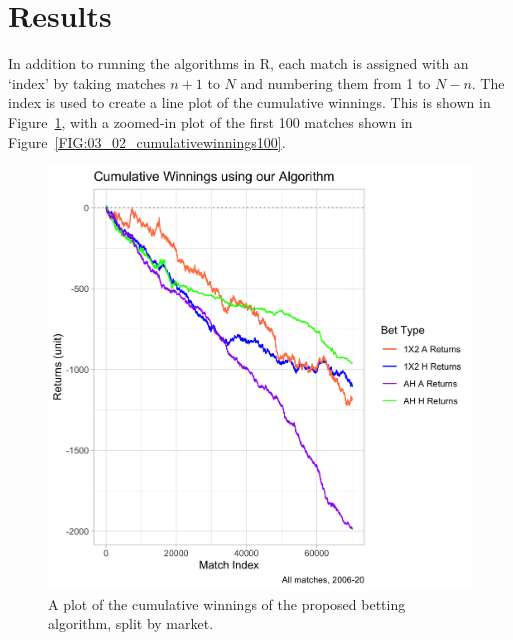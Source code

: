 \documentclass[a4paper,10pt]{report}
\begin{document}
\pagebreak
\section{Results}\label{sec:modelresults}

In addition to running the algorithms in R, each match is assigned with an `index' by taking matches $n+1$ to $N$ and numbering them from 1 to $N-n$. The index is used to create a line plot of the cumulative winnings. This is shown in Figure~\ref{FIG:03_01_cumulativewinnings}, with a zoomed-in plot of the first 100 matches shown in Figure~\ref{FIG:03_02_cumulativewinnings100}.

\begin{figure}[p!]\begin{center}
	\includegraphics[width=\textwidth]{model_01.png}  
	\caption{A plot of the cumulative winnings of the proposed betting algorithm, split by market.}\label{FIG:03_01_cumulativewinnings}
\end{center}\end{figure}
\end{document}
